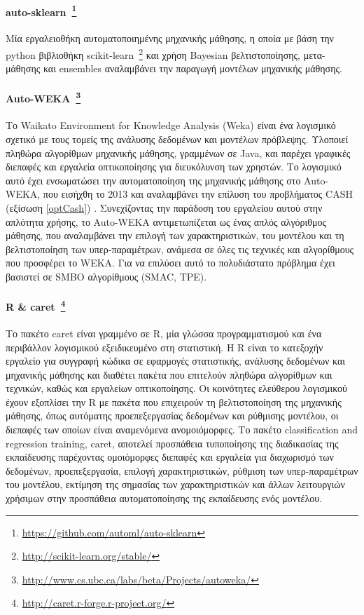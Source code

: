  \paragraph[auto-sklearn]{auto-sklearn~\footnote{\url{https://github.com/automl/auto-sklearn}} } Μία εργαλειοθήκη αυτοματοποιημένης μηχανικής μάθησης, η οποία με βάση την python βιβλιοθήκη scikit-learn~\footnote{\url{http://scikit-learn.org/stable/}} και χρήση Bayesian βελτιστοποίησης, μετα-μάθησης και ensembles αναλαμβάνει την παραγωγή μοντέλων μηχανικής μάθησης.
 
    
 \paragraph[Auto-WEKA]{Auto-WEKA~\footnote{\url{http://www.cs.ubc.ca/labs/beta/Projects/autoweka/}} }  Το Waikato Environment for Knowledge Analysis (Weka) είναι ένα λογισμικό σχετικό με τους τομείς της ανάλυσης δεδομένων και μοντέλων πρόβλεψης. Υλοποιεί πληθώρα αλγορίθμων μηχανικής μάθησης, γραμμένων σε Java, και παρέχει γραφικές διεπαφές και εργαλεία οπτικοποίησης για διευκόλυνση των χρηστών. Το λογισμικό αυτό έχει ενσωματώσει την αυτοματοποίηση της μηχανικής μάθησης στο Auto-WEKA, που εισήχθη το 2013 \citep{DBLP:journals/corr/abs-1208-3719} και αναλαμβάνει την επίλυση του προβλήματος  CASH (εξίσωση \ref{optCash}) . Συνεχίζοντας την παράδοση του εργαλείου αυτού στην απλότητα χρήσης, το Auto-WEKA αντιμετωπίζεται ως ένας απλός αλγόριθμος μάθησης, που αναλαμβάνει την επιλογή των χαρακτηριστικών, του μοντέλου και  τη βελτιστοποίηση των υπερ-παραμέτρων, ανάμεσα σε όλες τις τεχνικές και αλγορίθμους που προσφέρει το WEKA. Για να επιλύσει αυτό το πολυδιάστατο πρόβλημα έχει βασιστεί σε SMBO αλγορίθμους (SMAC, TPE).  
 \paragraph[caret]{R \& caret~\footnote{\url{http://caret.r-forge.r-project.org/}} }  Το πακέτο caret είναι γραμμένο σε R, μία γλώσσα προγραμματισμού και ένα περιβάλλον λογισμικού εξειδικευμένο στη στατιστική. Η R είναι το κατεξοχήν εργαλείο για συγγραφή κώδικα σε εφαρμογές στατιστικής, ανάλυσης δεδομένων και μηχανικής μάθησης και  διαθέτει πακέτα που επιτελούν πληθώρα αλγορίθμων και τεχνικών, καθώς και εργαλείων οπτικοποίησης. Οι κοινότητες ελεύθερου λογισμικού έχουν εξοπλίσει την R με πακέτα που επιχειρούν τη βελτιστοποίηση της μηχανικής μάθησης, όπως αυτόματης προεπεξεργασίας δεδομένων και  ρύθμισης μοντέλου, οι διεπαφές των οποίων είναι αναμενόμενα ανομοιόμορφες.  Το πακέτο classification and regression training, caret, αποτελεί προσπάθεια τυποποίησης της διαδικασίας της εκπαίδευσης παρέχοντας ομοιόμορφες διεπαφές και  εργαλεία για διαχωρισμό των δεδομένων, προεπεξεργασία, επιλογή χαρακτηριστικών, ρύθμιση των υπερ-παραμέτρων του μοντέλου, εκτίμηση της σημασίας των χαρακτηριστικών και άλλων λειτουργιών χρήσιμων στην προσπάθεια αυτοματοποίησης της εκπαίδευσης ενός μοντέλου.

